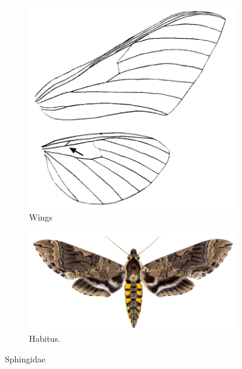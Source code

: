 \documentclass[letterpaper, 11pt]{article}
\begin{document}
\begin{figure}[ht!]
    \centering
    \begin{subfigure}[ht!]{0.35\textwidth}
        \includegraphics[width=\textwidth]{SphingidWings}
        \caption{Wings \citep[][Plate XIII, Fig. 3]{bhl38041}}
        \label{fig:sphingid1}
    \end{subfigure}
    \hfill %
    \begin{subfigure}[ht!]{0.6\textwidth}
        \includegraphics[width=\textwidth]{SphingidHabitus}
        \caption{Habitus. \citep[][Plate 67, Fig. 4]{druce1900biologia}}
        \label{fig:sphingid2}
    \end{subfigure}
    \caption{Sphingidae}\label{fig:sphingids}
\end{figure}
\end{document}
